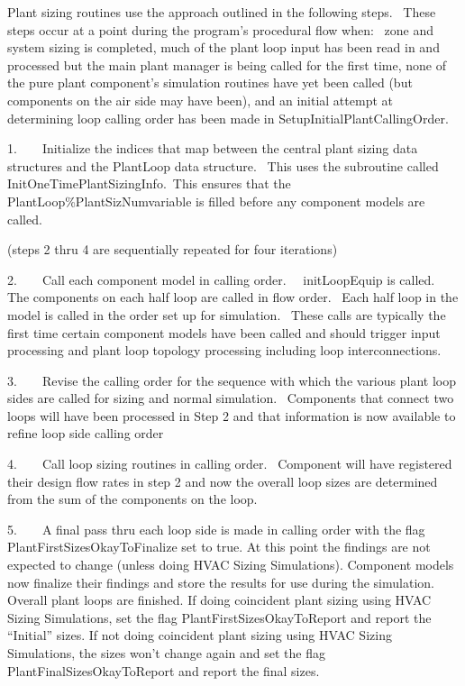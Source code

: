 Plant sizing routines use the approach outlined in the following steps.~ These steps occur at a point during the program's procedural flow when:~ zone and system sizing is completed, much of the plant loop input has been read in and processed but the main plant manager is being called for the first time, none of the pure plant component's simulation routines have yet been called (but components on the air side may have been), and an initial attempt at determining loop calling order has been made in SetupInitialPlantCallingOrder.

1.~~~~Initialize the indices that map between the central plant sizing data structures and the PlantLoop data structure.~ This uses the subroutine called InitOneTimePlantSizingInfo.~This ensures that the PlantLoop\%PlantSizNumvariable is filled before any component models are called.

(steps 2 thru 4 are sequentially repeated for four iterations)

2.~~~~Call each component model in calling order.~~ initLoopEquip is called.~ The components on each half loop are called in flow order.~ Each half loop in the model is called in the order set up for simulation.~ These calls are typically the first time certain component models have been called and should trigger input processing and plant loop topology processing including loop interconnections.

3.~~~~Revise the calling order for the sequence with which the various plant loop sides are called for sizing and normal simulation.~ Components that connect two loops will have been processed in Step 2 and that information is now available to refine loop side calling order

4.~~~~Call loop sizing routines in calling order.~ Component will have registered their design flow rates in step 2 and now the overall loop sizes are determined from the sum of the components on the loop.

5.~~~~A final pass thru each loop side is made in calling order with the flag PlantFirstSizesOkayToFinalize set to true. At this point the findings are not expected to change (unless doing HVAC Sizing Simulations). Component models now finalize their findings and store the results for use during the simulation. Overall plant loops are finished. If doing coincident plant sizing using HVAC Sizing Simulations, set the flag PlantFirstSizesOkayToReport and report the ``Initial'' sizes. If not doing coincident plant sizing using HVAC Sizing Simulations, the sizes won't change again and set the flag PlantFinalSizesOkayToReport and report the final sizes.

